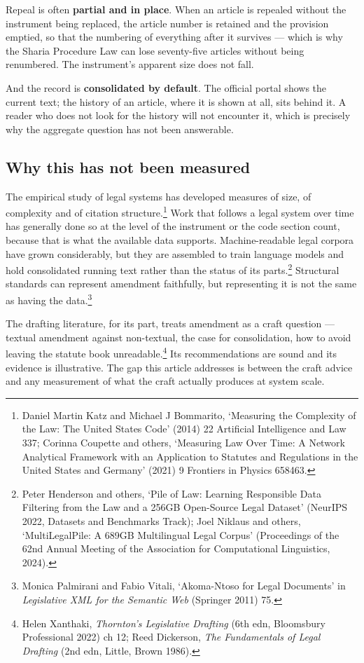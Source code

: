 \documentclass[11pt]{article}
\begin{document}
Repeal is often \textbf{partial and in place}. When an article is repealed
without the instrument being replaced, the article number is retained and the
provision emptied, so that the numbering of everything after it survives ---
which is why the Sharia Procedure Law can lose seventy-five articles without
being renumbered. The instrument's apparent size does not fall.

And the record is \textbf{consolidated by default}. The official portal shows
the current text; the history of an article, where it is shown at all, sits
behind it. A reader who does not look for the history will not encounter it,
which is precisely why the aggregate question has not been answerable.

\subsection{Why this has not been measured}

The empirical study of legal systems has developed measures of size, of
complexity and of citation structure.\footnote{Daniel Martin Katz and Michael
J Bommarito, `Measuring the Complexity of the Law: The United States Code'
(2014) 22 Artificial Intelligence and Law 337; Corinna Coupette and others,
`Measuring Law Over Time: A Network Analytical Framework with an Application
to Statutes and Regulations in the United States and Germany' (2021) 9
Frontiers in Physics 658463.} Work that follows a legal system over time has
generally done so at the level of the instrument or the code section count,
because that is what the available data supports. Machine-readable legal
corpora have grown considerably, but they are assembled to train language
models and hold consolidated running text rather than the status of its
parts.\footnote{Peter Henderson and others, `Pile of Law: Learning
Responsible Data Filtering from the Law and a 256GB Open-Source Legal
Dataset' (NeurIPS 2022, Datasets and Benchmarks Track); Joel Niklaus and
others, `MultiLegalPile: A 689GB Multilingual Legal Corpus' (Proceedings of
the 62nd Annual Meeting of the Association for Computational Linguistics,
2024).} Structural standards can represent amendment faithfully, but
representing it is not the same as having the data.\footnote{Monica
Palmirani and Fabio Vitali, `Akoma-Ntoso for Legal Documents' in
\emph{Legislative XML for the Semantic Web} (Springer 2011) 75.}

The drafting literature, for its part, treats amendment as a craft question
--- textual amendment against non-textual, the case for consolidation, how to
avoid leaving the statute book unreadable.\footnote{Helen Xanthaki,
\emph{Thornton's Legislative Drafting} (6th edn, Bloomsbury Professional
2022) ch 12; Reed Dickerson, \emph{The Fundamentals of Legal Drafting} (2nd
edn, Little, Brown 1986).} Its recommendations are sound and its evidence is
illustrative. The gap this article addresses is between the craft advice and
any measurement of what the craft actually produces at system scale.
\end{document}
